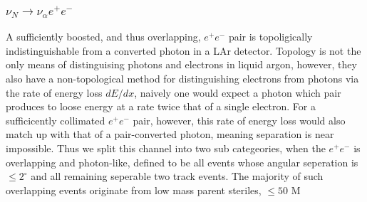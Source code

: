\documentclass[11pt, a4paper]{article}
\begin{document}
\subsubsection{$\nu_N \rightarrow \nu_\alpha e^+ e^-$ }

A sufficiently boosted, and thus overlapping, $e^+e^-$ pair is topoligically indistinguishable from a converted photon in a LAr detector. Topology is not the only means of distinguising photons and electrons in liquid argon, however, they also have a non-topological method for distinguishing electrons from photons via the rate of energy loss $dE/dx$, naively one would expect a photon which pair produces to loose energy at a rate twice that of a single electron. For a sufficicently collimated $e^+e^-$ pair, however, this rate of energy loss would also match up with that of a pair-converted photon, meaning separation is near impossible. Thus we split this channel into two sub categeories, when the $e^+e^-$ is overlapping and photon-like, defined to be all events whose angular seperation is $\leq 2^\circ$\cite{Spitz:2011wba} and all remaining seperable two track events. The majority of such overlapping events originate from low mass parent steriles, $\leq 50$ M\\ 
\end{document}

